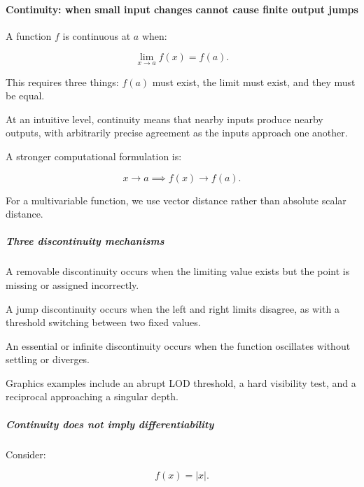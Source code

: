 \paragraph{Continuity: when small input changes cannot cause finite output jumps}\label{01-foundations-i-ch020-continuity-when-small-input-changes-cannot-cause-finite-output-jumps}

\hypertarget{01-foundations-i-ch020-continuity-when-small-input-changes-cannot-cause-finite-output-jumps}{}

A function \(f\) is continuous at \(a\) when:

\[
\lim_{x\to a}f(x)=f(a).
\]

This requires three things: \(f(a)\) must exist, the limit must exist, and they must be equal.

At an intuitive level, continuity means that nearby inputs produce nearby outputs, with arbitrarily precise agreement as the inputs approach one another.

A stronger computational formulation is:

\[
x\to a \implies f(x)\to f(a).
\]

For a multivariable function, we use vector distance rather than absolute scalar distance.

\subparagraph{Three discontinuity mechanisms}\label{01-foundations-i-ch020-three-discontinuity-mechanisms}

\hypertarget{01-foundations-i-ch020-three-discontinuity-mechanisms}{}

A removable discontinuity occurs when the limiting value exists but the point is missing or assigned incorrectly.

A jump discontinuity occurs when the left and right limits disagree, as with a threshold switching between two fixed values.

An essential or infinite discontinuity occurs when the function oscillates without settling or diverges.

Graphics examples include an abrupt LOD threshold, a hard visibility test, and a reciprocal approaching a singular depth.

\subparagraph{Continuity does not imply differentiability}\label{01-foundations-i-ch020-continuity-does-not-imply-differentiability}

\hypertarget{01-foundations-i-ch020-continuity-does-not-imply-differentiability}{}

Consider:

\[
f(x)=|x|.
\]

